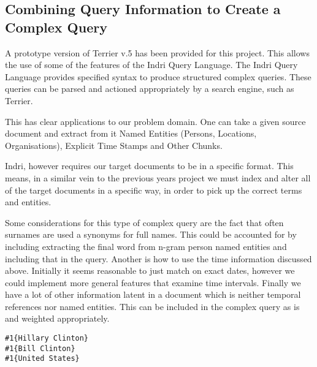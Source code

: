 \documentclass{mprop}
\newenvironment{codelisting}{\captionsetup{type=listing}}{}
\begin{document}
\subsection{Combining Query Information to Create a Complex Query}
\label{proposedapproach.complexquery}
A prototype version of Terrier v.5 has been provided for this project. This allows the use of some of the features of the Indri Query Language. The Indri Query Language provides specified syntax to produce structured complex queries. These queries can be parsed and actioned appropriately by a search engine, such as Terrier.

This has clear applications to our problem domain. One can take a given source document and extract from it Named Entities (Persons, Locations, Organisations), Explicit Time Stamps and Other Chunks.

Indri, however requires our target documents to be in a specific format. This means, in a similar vein to the previous years project we must index and alter all of the target documents in a specific way, in order to pick up the correct terms and entities.

Some considerations for this type of complex query are the fact that often surnames are used a synonyms for full names. This could be accounted for by including extracting the final word from n-gram person named entities and including that in the query. Another is how to use the time information discussed above. Initially it seems reasonable to just match on exact dates, however we could implement more general features that examine time intervals. Finally we have a lot of other information latent in a document which is neither temporal references nor named entities. This can be included in the complex query as is and weighted appropriately.

\begin{codelisting}
\begin{verbatim}
#1{Hillary Clinton}
#1{Bill Clinton}
#1{United States}
\end{verbatim}
\label{code:indrisample}
\end{codelisting}
\end{document}
